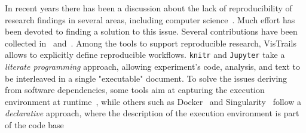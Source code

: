 \documentclass{llncs}
\begin{document}
In recent years there has been a discussion about the lack of reproducibility
of research findings in several areas, including 
computer science~\cite{DBLP:journals/cacm/CollbergP16,Hutson725}.
Much effort has been devoted to finding a solution to this issue. Several
contributions have been collected in~\cite{stodden2014implementing} 
and~\cite{kitzes2017practice}.
Among the tools to support reproducible research, 
VisTrails~\cite{DBLP:conf/sigmod/CallahanFSSSV06} allows to
explicitly define reproducible workflows.
\texttt{knitr} and \texttt{Jupyter} take a \emph{literate programming}
approach, allowing experiment's code, analysis, and text to be interleaved
in a single "executable" document.
To solve the issues deriving from software dependencies,
some tools aim at capturing the execution
environment at runtime~\cite{DBLP:journals/cse/Guo12,davison2014sumatra,DBLP:journals/jossw/RampinCSFS16},
while others such as Docker~\cite{DBLP:journals/sigops/Boettiger15}
and Singularity~\cite{kurtzer2017singularity} follow a \emph{declarative}
approach, where the description of the execution environment is part
of the code base
\end{document}
